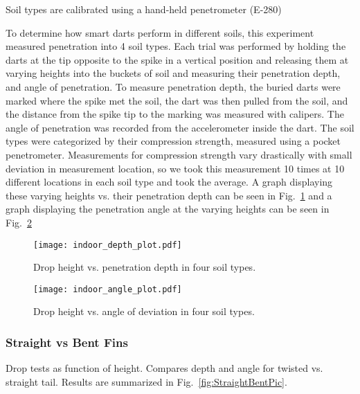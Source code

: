 Soil types are calibrated using a hand-held penetrometer (E-280)

To determine how smart darts perform in different soils, this experiment measured penetration into 4 soil types.  Each trial was performed by holding the darts at the tip opposite to the spike in a vertical position and releasing them at varying heights into the buckets of soil and measuring their penetration depth, and angle of penetration. To measure penetration depth, the buried darts were marked where the spike met the soil, the dart was then pulled from the soil, and the distance from the spike tip to the marking was measured with calipers. The angle of penetration was recorded from the accelerometer inside the dart. The soil types were categorized by their compression strength, measured using a pocket penetrometer. Measurements for compression strength vary drastically with small deviation in measurement location, so we took this measurement 10 times at 10 different locations in each soil type and took the average. A graph displaying these varying heights vs. their penetration depth can be seen in Fig.~\ref{fig:DepthPlotIndoors} and a graph displaying the penetration angle at the varying heights can be seen in Fig.\ \ref{fig:AnglePlotIndoors}

\begin{figure} \centering
{\texttt{[image: indoor\_depth\_plot.pdf]}}
\caption{Drop height vs. penetration depth in four soil types.} 
\label{fig:DepthPlotIndoors}
\end{figure}

\begin{figure} \centering
{\texttt{[image: indoor\_angle\_plot.pdf]}}
\caption{Drop height vs. angle of deviation in four soil types.} 
\label{fig:AnglePlotIndoors}
\vspace{-1em}
\end{figure}

\subsubsection{Straight vs Bent Fins}

Drop tests as function of height. Compares depth and angle for twisted vs. straight tail.
Results are summarized in Fig.~\ref{fig:StraightBentPic}.

